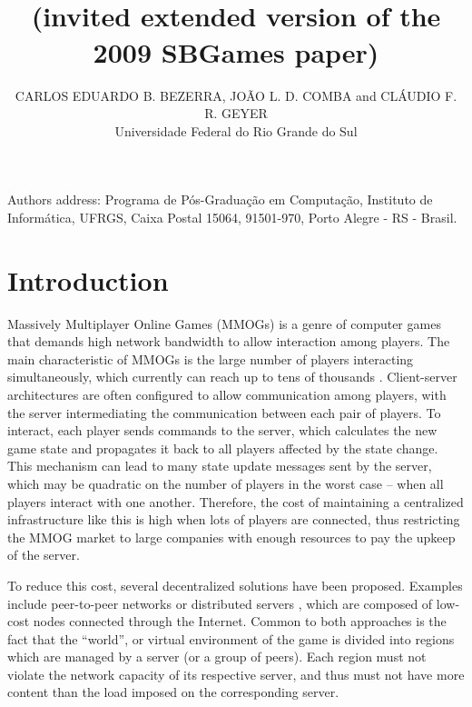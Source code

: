 \documentclass[acmjacm]{acmtrans2m}
\title{\titulo{}\\ \large{(invited extended version of the 2009 SBGames paper)}}
\author{CARLOS EDUARDO B. BEZERRA, JOÃO L. D. COMBA and CLÁUDIO F. R. GEYER\\Universidade Federal do Rio Grande do Sul}
\let\mycounter\setcounter
\begin{document}
\setcounter{page}{1}



{\let\setcounter\mycounter
    \begin{bottomstuff}
    	Authors address: Programa de Pós-Graduação em Computação,
		Instituto de Informática, UFRGS,
		Caixa Postal 15064, 91501-970, Porto Alegre - RS - Brasil.
    \end{bottomstuff}
}

\maketitle


\section{Introduction}

Massively Multiplayer Online Games (MMOGs) is a genre of computer games that demands high network bandwidth to allow
interaction among players. The main characteristic of MMOGs is the large number of players interacting simultaneously, which currently can reach up to tens of thousands \cite{schiele2007rpp}. Client-server architectures are often configured to allow communication among players, with the server intermediating the communication between each pair of players. To interact, each player sends commands to the server, which calculates the new game state and propagates it back to all players affected by the state change. This mechanism can lead to many state update messages sent by the server, which may be quadratic on the number of players in the worst case -- when all players interact with one another. Therefore, the cost of maintaining a centralized infrastructure like this is high when lots of players are connected, thus restricting the MMOG market to large companies with enough resources to pay the upkeep of the server.

To reduce this cost, several decentralized solutions have been proposed. Examples include peer-to-peer networks \cite{schiele2007rpp,rieche2007ppb,hampel2006ppa,elrhalibi2005abm,iimura2004zfg,knutsson2004pps} or distributed servers
\cite{ng2002msa,chertov:olb,lee2003sdl,assiotis2006dam},
which are composed of low-cost nodes connected through the Internet. Common to both approaches is the fact that the ``world'', or virtual environment of the game is divided into regions which are managed by a server (or a group of peers). Each region must not violate the network capacity of its respective server, and thus must not have more content than the load imposed on the corresponding server.
\end{document}
